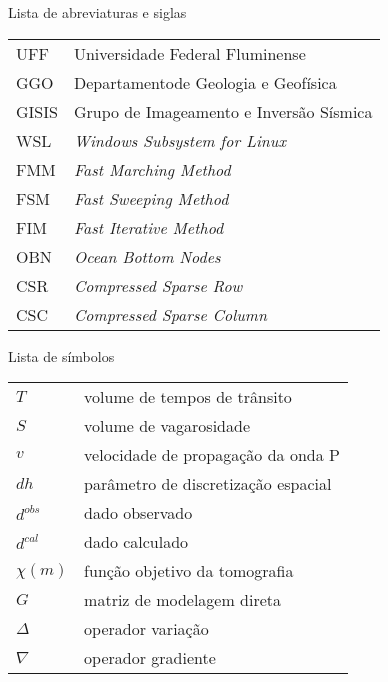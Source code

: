 \listoffigures*
\cleardoublepage

\listoftables*
\cleardoublepage

\begin{center}
\fonteLista Lista de abreviaturas e siglas 
\end{center}

\vspace{2cm}
\fonteNormalSize
\begin{tabular}{l l}
    UFF & Universidade Federal Fluminense \\ [1.0ex]
    GGO & Departamentode Geologia e Geofísica \\ [1.0ex]
    GISIS & Grupo de Imageamento e Inversão Sísmica \\ [1.0ex]
	WSL & \textit{Windows Subsystem for Linux} \\ [1.0ex]
	FMM & \textit{Fast Marching Method} \\ [1.0ex]
	FSM & \textit{Fast Sweeping Method} \\ [1.0ex]
	FIM & \textit{Fast Iterative Method} \\ [1.0ex]
	OBN & \textit{Ocean Bottom Nodes} \\ [1.0ex]
	CSR & \textit{Compressed Sparse Row} \\ [1.0ex]
	CSC & \textit{Compressed Sparse Column}
\end{tabular}
\cleardoublepage


\begin{center}
    \fonteLista Lista de símbolos
\end{center}

\vspace{2cm}
\fonteNormalSize
\begin{tabular}{l l}
    $ T $ & volume de tempos de trânsito \\ [1.0ex]
    $ S $ & volume de vagarosidade \\ [1.0ex] 
    $ v $ & velocidade de propagação da onda P \\ [1.0ex]
    $ dh $ & parâmetro de discretização espacial \\ [1.0ex]
    $ d^{obs} $ & dado observado \\ [1.0ex]
    $ d^{cal} $ & dado calculado \\ [1.0ex]
    $ \chi(m) $ & função objetivo da tomografia \\ [1.0ex]
    $ G $ & matriz de modelagem direta \\ [1.0ex]
    $ \Delta $ & operador variação \\ [1.0ex]
    $ \nabla $ & operador gradiente \\ [1.0ex]
\end{tabular}

    
